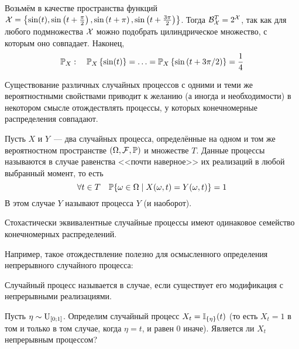 \begin{solution}
    Возьмём в качестве пространства функций $ \mathcal{X} = \left\{ \sin(t), \sin\left( t + \frac{\pi}{2} \right), \sin\left( t + \pi \right), \sin\left( t + \frac{3 \pi}{2} \right) \right\} $.
    Тогда $ \mathcal{B}_{\mathcal{X}}^T = 2^{\mathcal{X}} $,
    так как для любого подмножества $ \mathcal{X} $ можно подобрать цилиндрическое множество, с которым оно совпадает.
    Наконец,
    \[
        \mathbb{P}_X: \quad \mathbb{P}_X \left\{ \sin(t) \right\} = \ldots = \mathbb{P}_X \left\{ \sin\left( t + 3 \pi/2 \right) \right\} = \frac{1}{4}
    \]
\end{solution}


Существование различных случайных процессов с одними и теми же
вероятностными свойствами приводит к желанию (а иногда и необходимости)
в некотором смысле отождествлять процессы,
у которых конечномерные распределения совпадают.

\begin{definition}
    \label{definition:basics:modification}
    Пусть $ X $ и $ Y $~--- два случайных процесса,
    определённые на одном и том же вероятностном пространстве $ (\Omega, \mathcal{F}, \mathbb{P}) $ и множестве $ T $.
    Данные процессы называются  в случае равенства <<почти наверное>> их реализаций в любой выбранный момент,
    то есть
    \[
        \forall t \in T \quad \mathbb{P} \{ \omega \in \Omega \mid X(\omega, t) = Y(\omega, t) \} = 1
    \]
    В этом случае $ Y $ называют  процесса $ Y $ (и наоборот).
\end{definition}

\begin{statement}
    \label{statement:basics:finite_distributions_of_modifications}
    Стохастически эквивалентные случайные процессы имеют одинаковое семейство конечномерных распределений.
\end{statement}

Например, такое отождествление полезно для осмысленного определения непрерывного случайного процесса:
\begin{definition}
    \label{definition:basics:continious_stochastic_process}
    Случайный процесс называется  в случае,
    если существует его модификация с непрерывными реализациями.
\end{definition}

\begin{exercise}
    \label{exercise:basics:continious_stochastic_process}
    Пусть $ \eta \sim \textnormal{U}_{[0;1]} $.
    Определим случайный процесс $ X_t = \mathbb{I}_{\{\eta\}}(t) $
    (то есть $ X_t = 1 $ в том и только в том случае, когда $ \eta = t $, и равен $ 0 $ иначе).
    Является ли $ X_t $ непрерывным процессом?
\end{exercise}

